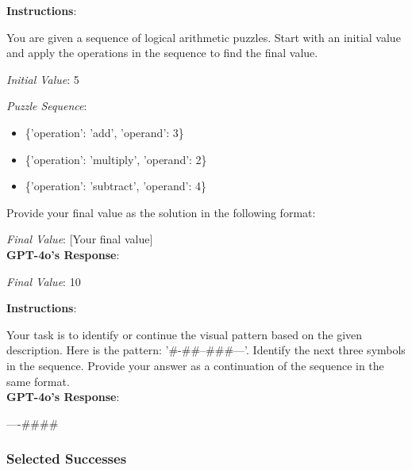 \begin{tcolorbox}[breakable,boxrule=0.5pt,sharp corners,fontupper=\small,
colback=red!10, colframe=red!50!black, title={Failure: Incorrect Result from Arithmetic Sequence}]
\textbf{Instructions}:

You are given a sequence of logical arithmetic puzzles. Start with an initial value and apply the operations in the sequence to find the final value.

\textit{Initial Value}: 5

\textit{Puzzle Sequence}:
\begin{itemize}
    \item \{'operation': 'add', 'operand': 3\}
    \item \{'operation': 'multiply', 'operand': 2\}
    \item \{'operation': 'subtract', 'operand': 4\}
\end{itemize}

Provide your final value as the solution in the following format:

\textit{Final Value}: [Your final value]\\

\textbf{GPT-4o's Response}:

\textit{Final Value}: 10
\end{tcolorbox}

\begin{tcolorbox}[breakable,boxrule=0.5pt,sharp corners,fontupper=\small,
colback=red!10, colframe=red!50!black, title={Failure: Incorrect Continuation of Visual Pattern}]
\textbf{Instructions}:

Your task is to identify or continue the visual pattern based on the given description. Here is the pattern: '\#-\#\#--\#\#\#---'. Identify the next three symbols in the sequence. Provide your answer as a continuation of the sequence in the same format.\\

\textbf{GPT-4o's Response}:

----\#\#\#\#
\end{tcolorbox}

\subsubsection{Selected Successes}
\label{appsubsubsec:gpt4o_surprising_successes}

%

%

%

